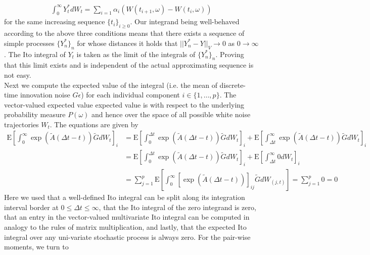 \documentclass[10pt,letterpaper]{article}
\begin{document}
\begin{align}
\int_0^\infty Y^*_t dW_t = \sum_{i=1} \alpha_i (W(t_{i+1},\omega) - W(t_{i},\omega))
\end{align}
for the same increasing sequence $\{t_i\}_{i\geq0}$. Our integrand being well-behaved according to the above three conditions means that there exists a sequence of simple processes $\{Y^*_n\}_n$ for whose distances it holds that $||Y^*_n - Y||_V \rightarrow 0$ as $0 \rightarrow \infty$. The Ito integral of $Y_t$ is taken as the limit of the integrals of $\{Y^*_n\}_n$. Proving that this limit exists and is independent of the actual approximating sequence is not easy. \\
Next we compute the expected value of the integral (i.e. the mean of discrete-time innovation noise $G \epsilon$) for each individual component $i \in \{1, \ldots, p\}$. The vector-valued expected value expected value is with respect to the underlying probability measure $P(\omega)$ and hence over the space of all possible white noise trajectories $W_t$. The equations are given by
\begin{align}
\mbox{E}\left[\int_0^\infty \exp(\tilde{A}(\Delta{}t - t)) \tilde{G} dW_t\right]_i &=  
\mbox{E} \left[\int_0^{\Delta{}t} \exp(\tilde{A}(\Delta{}t - t)) \tilde{G} dW_t \right]_i + \mbox{E} \left[\int_{\Delta{}t}^\infty \exp(\tilde{A}(\Delta{}t - t)) \tilde{G} dW_t \right]_i \\
&= \mbox{E} \left[\int_0^{\Delta{}t} \exp(\tilde{A}(\Delta{}t - t)) \tilde{G} dW_t \right]_i + \mbox{E} \left[\int_{\Delta{}t}^\infty 0 dW_t \right]_i \\
&= \sum_{j=1}^p \mbox{E}\left[\int_0^\infty \left[\exp(\tilde{A}(\Delta{}t - t))\right]_{ij} \tilde{G} dW_{(j,t)}\right] = \sum_{j=1}^p 0 = 0
\end{align}
Here we used that a well-defined Ito integral can be split along its integration interval border at $0 \leq \Delta{}t \leq \infty$, that the Ito integral of the zero integrand is zero, that an entry in the vector-valued multivariate Ito integral can be computed in analogy to the rules of matrix multiplication, and lastly, that the expected Ito integral over any uni-variate stochastic process is always zero. For the pair-wise moments, we turn to 
\end{document}
